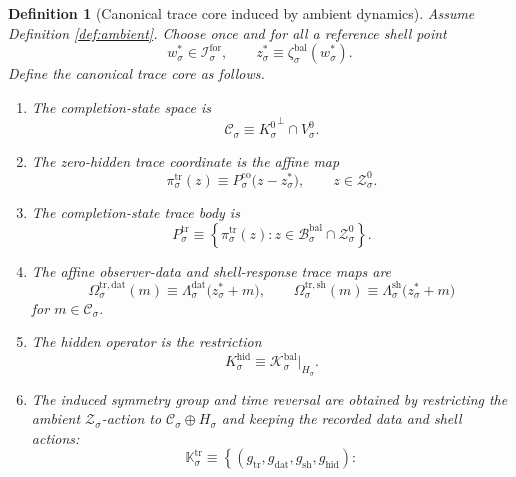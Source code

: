 \documentclass[11pt]{article}
\newcommand{\ForSpace}[1]{\mathcal I_{#1}^{\mathrm{for}}}
\newcommand{\BalSpace}[1]{\mathcal Z_{#1}}
\newcommand{\BalBody}[1]{\mathcal B_{#1}^{\mathrm{bal}}}
\newcommand{\BalData}[1]{\Lambda_{#1}^{\mathrm{dat}}}
\newcommand{\BalShell}[1]{\Lambda_{#1}^{\mathrm{sh}}}
\newcommand{\ZeroHiddenSlice}[1]{\mathcal Z_{#1}^{0}}
\newcommand{\ZeroHiddenVec}[1]{V_{#1}^{0}}
\newcommand{\Kernel}[1]{K_{#1}^{0}}
\newcommand{\BalOp}[1]{\mathcal K_{#1}^{\mathrm{bal}}}
\newcommand{\BalEmbed}[1]{\zeta_{#1}^{\mathrm{bal}}}
\newcommand{\ReferencePoint}[1]{z_{#1}^{\ast}}
\newcommand{\StateComp}[1]{P_{#1}^{\mathrm{co}}}
\newcommand{\GapSpace}[1]{H_{#1}}
\newcommand{\HiddenOperator}[1]{K_{#1}^{\mathrm{hid}}}
\newcommand{\CoreState}[1]{\mathcal C_{#1}}
\newcommand{\TraceBody}[1]{P_{#1}^{\mathrm{tr}}}
\newcommand{\TraceCoord}[1]{\pi_{#1}^{\mathrm{tr}}}
\newcommand{\TraceDataMap}[1]{\Omega_{#1}^{\mathrm{tr,dat}}}
\newcommand{\TraceShellMap}[1]{\Omega_{#1}^{\mathrm{tr,sh}}}
\newcommand{\TraceSym}[1]{\mathbb K_{#1}^{\mathrm{tr}}}
\newtheorem{definition}{Definition}
\begin{document}
\begin{definition}[Canonical trace core induced by ambient dynamics]
\label{def:canonical}
Assume Definition \ref{def:ambient}. Choose once and for all a reference shell point
\[
w_{\sigma}^{\ast}\in\ForSpace{\sigma},
\qquad
\ReferencePoint{\sigma}\equiv \BalEmbed{\sigma}(w_{\sigma}^{\ast}).
\]
Define the canonical trace core as follows.
\begin{enumerate}
    \item The completion-state space is
    \[
    \CoreState{\sigma}
    \equiv
    {\Kernel{\sigma}}^{\perp}\cap\ZeroHiddenVec{\sigma}.
    \]
    \item The zero-hidden trace coordinate is the affine map
    \begin{equation}
    \TraceCoord{\sigma}(z)
    \equiv
    \StateComp{\sigma}\bigl(z-\ReferencePoint{\sigma}\bigr),
    \qquad
    z\in\ZeroHiddenSlice{\sigma}.
    \label{eq:tracecoord}
    \end{equation}
    \item The completion-state trace body is
    \begin{equation}
    \TraceBody{\sigma}
    \equiv
    \left\{
    \TraceCoord{\sigma}(z):
    z\in\BalBody{\sigma}\cap\ZeroHiddenSlice{\sigma}
    \right\}.
    \label{eq:ambienttracebody}
    \end{equation}
    \item The affine observer-data and shell-response trace maps are
    \begin{equation}
    \TraceDataMap{\sigma}(m)
    \equiv
    \BalData{\sigma}\bigl(\ReferencePoint{\sigma}+m\bigr),
    \qquad
    \TraceShellMap{\sigma}(m)
    \equiv
    \BalShell{\sigma}\bigl(\ReferencePoint{\sigma}+m\bigr)
    \label{eq:ambienttracemaps}
    \end{equation}
    for \(m\in\CoreState{\sigma}\).
    \item The hidden operator is the restriction
    \begin{equation}
    \HiddenOperator{\sigma}
    \equiv
    \BalOp{\sigma}\big|_{\GapSpace{\sigma}}.
    \label{eq:ambienttraceop}
    \end{equation}
    \item The induced symmetry group and time reversal are obtained by restricting the ambient \(\BalSpace{\sigma}\)-action to \(\CoreState{\sigma}\oplus\GapSpace{\sigma}\) and keeping the recorded data and shell actions:
    \[
    \TraceSym{\sigma}
    \equiv
    \left\{
    (g_{\mathrm{tr}},g_{\mathrm{dat}},g_{\mathrm{sh}},g_{\mathrm{hid}}):
\]
\end{enumerate}
\end{definition}
\end{document}
